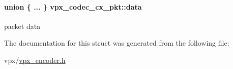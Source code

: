 \paragraph[{\texorpdfstring{data}{data}}]{\setlength{\rightskip}{0pt plus 5cm}union \{ ... \}   vpx\+\_\+codec\+\_\+cx\+\_\+pkt\+::data}\hypertarget{structvpx__codec__cx__pkt_a7f97b060a23b7e89fe5b885c0074f696}{}\label{structvpx__codec__cx__pkt_a7f97b060a23b7e89fe5b885c0074f696}
packet data 

The documentation for this struct was generated from the following file\+:\begin{DoxyCompactItemize}
\item 
vpx/\hyperlink{vpx__encoder_8h}{vpx\+\_\+encoder.\+h}\end{DoxyCompactItemize}
